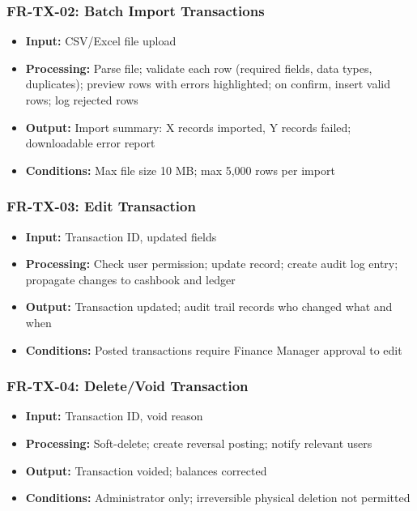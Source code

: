 \documentclass[journal, a4paper, onecolumn, 12pt]{IEEEtran}
\begin{document}
\subsubsection{FR-TX-02: Batch Import Transactions}
\begin{itemize}[leftmargin=*]
\item \textbf{Input:} CSV/Excel file upload
\item \textbf{Processing:} Parse file; validate each row (required fields, data types, duplicates); preview rows with errors highlighted; on confirm, insert valid rows; log rejected rows
\item \textbf{Output:} Import summary: X records imported, Y records failed; downloadable error report
\item \textbf{Conditions:} Max file size 10 MB; max 5,000 rows per import
\end{itemize}

\subsubsection{FR-TX-03: Edit Transaction}
\begin{itemize}[leftmargin=*]
\item \textbf{Input:} Transaction ID, updated fields
\item \textbf{Processing:} Check user permission; update record; create audit log entry; propagate changes to cashbook and ledger
\item \textbf{Output:} Transaction updated; audit trail records who changed what and when
\item \textbf{Conditions:} Posted transactions require Finance Manager approval to edit
\end{itemize}

\subsubsection{FR-TX-04: Delete/Void Transaction}
\begin{itemize}[leftmargin=*]
\item \textbf{Input:} Transaction ID, void reason
\item \textbf{Processing:} Soft-delete; create reversal posting; notify relevant users
\item \textbf{Output:} Transaction voided; balances corrected
\item \textbf{Conditions:} Administrator only; irreversible physical deletion not permitted
\end{itemize}
\end{document}
